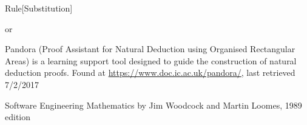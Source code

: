 \begin{namedthm}{Rule}[Substitution]

\begin{bprooftree}
\end{bprooftree}\qquad or \qquad
\begin{bprooftree}
\end{bprooftree}

\end{namedthm}

\pagebreak

\begin{thebibliography}{9}

Pandora (Proof Assistant for Natural Deduction using Organised Rectangular Areas) is a learning support tool designed to guide the construction of natural deduction proofs. Found at \url{https://www.doc.ic.ac.uk/pandora/}, last retrieved 7/2/2017

Software Engineering Mathematics by Jim Woodcock and Martin Loomes, 1989 edition


\end{thebibliography}





